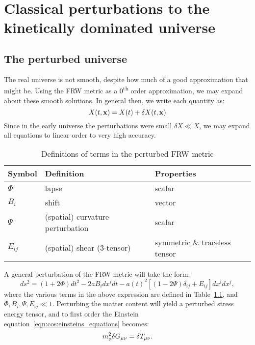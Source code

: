 \chapter{Classical perturbations to the kinetically dominated universe}
\label{chap:cls}

\section{The perturbed universe}
The real universe is not smooth, despite how much of a good approximation that might be. Using the FRW metric as a 0\textsuperscript{th} order approximation, we may expand about these smooth solutions. In general then, we write each quantity as:
\begin{equation}
  X(t,\mathbf{x}) = X(t) + \delta X(t,\mathbf{x})
  \label{eqn:cos:expansion}
\end{equation}
Since in the early universe the perturbations were small $\delta X \ll X$, we may expand all equations to linear order to very high accuracy.

\begin{table}
  \centering
\begin{tabular}{lll}
 \toprule
  Symbol & Definition & Properties \\
 \midrule
 \midrule
 $\Phi$ & lapse & scalar\\
 $B_i$ & shift & vector\\
 $\Psi$ & (spatial) curvature perturbation  & scalar\\
 $E_{ij}$ & (spatial) shear (3-tensor) & symmetric \& traceless tensor\\
 \bottomrule
\end{tabular}
\caption{Definitions of terms in the perturbed FRW metric}\label{tab:cos:perturbed_metric}
\end{table}


A general perturbation of the FRW metric will take the form:
\begin{equation}
  ds^2 = (1+2\Phi)dt^2 -2a B_i dx^i dt  -a{(t)}^2 \left[ \left( 1 - 2 \Psi \right)\delta_{ij} + E_{ij} \right] dx^i dx^j,
  \label{eqn:cos:FRW_perturb}
\end{equation}
where the various terms in the above expression are defined in Table~\ref{tab:cos:perturbed_metric}, and $\Phi,B_i,\Psi,E_{ij}\ll1$. Perturbing the matter content will yield a perturbed stress energy tensor, and to first order the Einstein equation~\eqref{eqn:cos:einsteins_equations} becomes:
\begin{equation}
 m_{\mathrm{p}}^2 \delta G_{\mu\nu} = \delta T_{\mu\nu}.
  \label{eqn:cos:einsteins_equations_perturb}
\end{equation}


